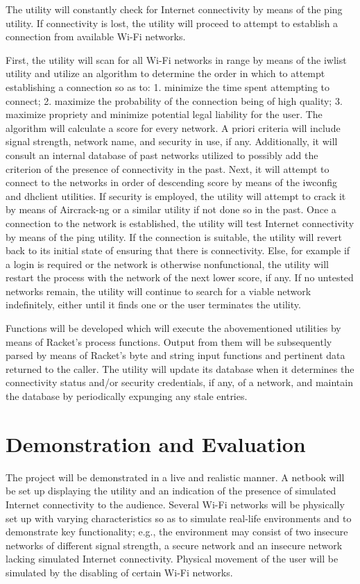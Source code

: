 \documentclass{article}
\begin{document}
The utility will constantly check for Internet connectivity by means of the ping
utility. If connectivity is lost, the utility will proceed to attempt to
establish a connection from available Wi-Fi networks.

First, the utility will scan for all Wi-Fi networks in range by means of the
iwlist utility and utilize an algorithm to determine the order in which to
attempt establishing a connection so as to: 1. minimize the time spent
attempting to connect; 2. maximize the probability of the connection being of
high quality; 3. maximize propriety and minimize potential legal liability for
the user. The algorithm will calculate a score for every network. A priori
criteria will include signal strength, network name, and security in use, if
any. Additionally, it will consult an internal database of past networks
utilized to possibly add the criterion of the presence of connectivity in the
past. Next, it will attempt to connect to the networks in order of descending
score by means of the iwconfig and dhclient utilities. If security is employed,
the utility will attempt to crack it by means of Aircrack-ng or a similar
utility if not done so in the past. Once a connection to the network is
established, the utility will test Internet connectivity by means of the ping
utility. If the connection is suitable, the utility will revert back to its
initial state of ensuring that there is connectivity. Else, for example if a
login is required or the network is otherwise nonfunctional, the utility will
restart the process with the network of the next lower score, if any.  If no
untested networks remain, the utility will continue to search for a viable
network indefinitely, either until it finds one or the user terminates the
utility.

Functions will be developed which will execute the abovementioned utilities by
means of Racket's process functions. Output from them will be subsequently
parsed by means of Racket's byte and string input functions and pertinent data
returned to the caller. The utility will update its database when it determines
the connectivity status and/or security credentials, if any, of a network, and
maintain the database by periodically expunging any stale entries.

\section{Demonstration and Evaluation}
The project will be demonstrated in a live and realistic manner. A netbook will
be set up displaying the utility and an indication of the presence of simulated
Internet connectivity to the audience. Several Wi-Fi networks will be physically
set up with varying characteristics so as to simulate real-life environments and
to demonstrate key functionality; e.g., the environment may consist of two
insecure networks of different signal strength, a secure network and an insecure
network lacking simulated Internet connectivity. Physical movement of the user
will be simulated by the disabling of certain Wi-Fi networks.
\end{document}
